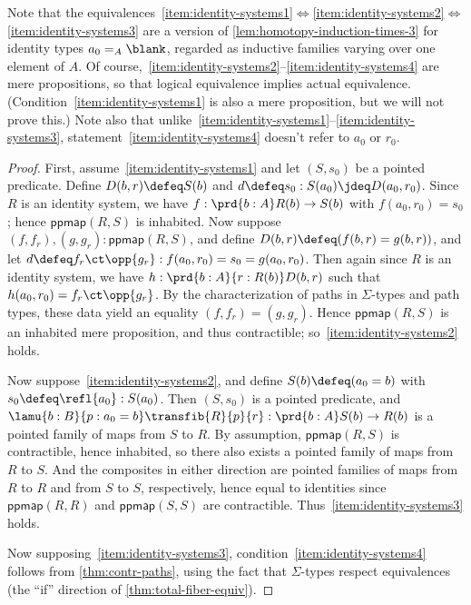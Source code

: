 Note that the equivalences~\ref{item:identity-systems1}$\Leftrightarrow$\ref{item:identity-systems2}$\Leftrightarrow$\ref{item:identity-systems3} are a version of \cref{lem:homotopy-induction-times-3} for identity types $a_0 =_A \blank$, regarded as inductive families varying over one element of $A$.
Of course,~\ref{item:identity-systems2}--\ref{item:identity-systems4} are mere propositions, so that logical equivalence implies actual equivalence.
(Condition~\ref{item:identity-systems1} is also a mere proposition, but we will not prove this.)
Note also that unlike~\ref{item:identity-systems1}--\ref{item:identity-systems3}, statement~\ref{item:identity-systems4} doesn't refer to $a_0$ or $r_0$.

\begin{proof}
  First, assume~\ref{item:identity-systems1} and let $(S,s_0)$ be a pointed predicate.
  Define $D(b,r) \defeq S(b)$ and $d\defeq s_0: S(a_0) \jdeq D(a_0,r_0)$.
  Since $R$ is an identity system, we have $f:\prd{b:A} R(b) \to S(b)$ with $f(a_0,r_0) = s_0$; hence $\mathsf{ppmap}(R,S)$ is inhabited.
  Now suppose $(f,f_r),(g,g_r) : \mathsf{ppmap}(R,S)$, and define $D(b,r) \defeq (f(b,r) = g(b,r))$, and let $d \defeq f_r \ct \opp{g_r} : f(a_0,r_0) = s_0 = g(a_0,r_0)$.
  Then again since $R$ is an identity system, we have $h:\prd{b:A}{r:R(b)} D(b,r)$ such that $h(a_0,r_0) = f_r \ct \opp{g_r}$.
  By the characterization of paths in $\Sigma$-types and path types, these data yield an equality $(f,f_r) = (g,g_r)$.
  Hence $\mathsf{ppmap}(R,S)$ is an inhabited mere proposition, and thus contractible; so~\ref{item:identity-systems2} holds.

  Now suppose~\ref{item:identity-systems2}, and define $S(b) \defeq (a_0=b)$ with $s_0 \defeq \refl{a_0}:S(a_0)$.
  Then $(S,s_0)$ is a pointed predicate, and $\lamu{b:B}{p:a_0=b} \transfib{R}{p}{r} : \prd{b:A} S(b) \to R(b)$ is a pointed family of maps from $S$ to $R$.
  By assumption, $\mathsf{ppmap}(R,S)$ is contractible, hence inhabited, so there also exists a pointed family of maps from $R$ to $S$.
  And the composites in either direction are pointed families of maps from $R$ to $R$ and from $S$ to $S$, respectively, hence equal to identities since $\mathsf{ppmap}(R,R)$ and $\mathsf{ppmap}(S,S)$ are contractible.
  Thus~\ref{item:identity-systems3} holds.

  Now supposing~\ref{item:identity-systems3}, condition~\ref{item:identity-systems4} follows from \cref{thm:contr-paths}, using the fact that $\Sigma$-types respect equivalences (the ``if'' direction of \cref{thm:total-fiber-equiv}).


\end{proof}
